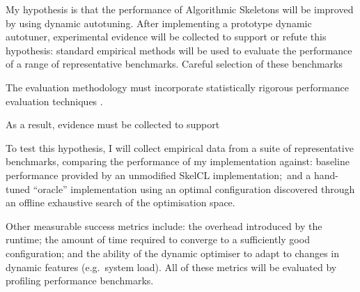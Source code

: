 My hypothesis is that the performance of Algorithmic Skeletons will be
improved by using dynamic autotuning. After implementing a prototype
dynamic autotuner, experimental evidence will be collected to support
or refute this hypothesis: standard empirical methods will be used to
evaluate the performance of a range of representative
benchmarks. Careful selection of these benchmarks

The evaluation methodology must incorporate statistically rigorous
performance evaluation techniques \cite{Georges2007}.

As a result, evidence must be collected to support

To test this hypothesis, I will
collect empirical data from a suite of representative benchmarks,
comparing the performance of my implementation against: baseline
performance provided by an unmodified SkelCL implementation;\ and a
hand-tuned ``oracle'' implementation using an optimal configuration
discovered through an offline exhaustive search of the optimisation
space.

Other measurable success metrics include: the overhead introduced by
the runtime; the amount of time required to converge to a sufficiently
good configuration; and the ability of the dynamic optimiser to adapt
to changes in dynamic features (e.g.\ system load). All of these
metrics will be evaluated by profiling performance benchmarks.

